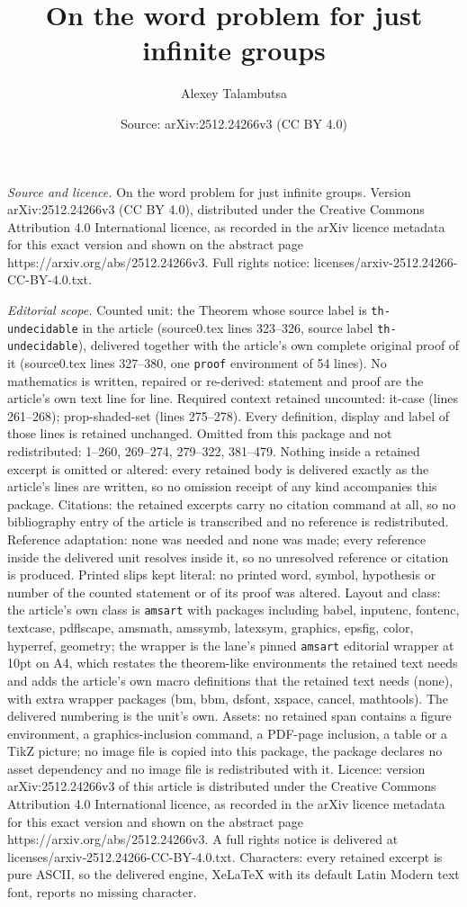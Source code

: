 \documentclass[10pt,a4paper]{amsart}
\title[On the word problem for just infinite groups]{On the word problem for just infinite groups}
\author{Alexey Talambutsa}
\date{Source: arXiv:2512.24266v3 (CC BY 4.0)}
\begin{document}
\maketitle

\noindent\emph{Source and licence.} On the word problem for just infinite groups. Version arXiv:2512.24266v3 (CC BY 4.0), distributed under the Creative Commons Attribution 4.0 International licence, as recorded in the arXiv licence metadata for this exact version and shown on the abstract page https://arxiv.org/abs/2512.24266v3. Full rights notice: licenses/arxiv-2512.24266-CC-BY-4.0.txt.\par\smallskip

\noindent\textit{Editorial scope.} Counted unit: the Theorem whose source label is \texttt{th-undecidable} in the article (source0.tex lines 323--326, source label \texttt{th-undecidable}), delivered together with the article's own complete original proof of it (source0.tex lines 327--380, one \texttt{proof} environment of 54 lines). No mathematics is written, repaired or re-derived: statement and proof are the article's own text line for line. Required context retained uncounted: it-case (lines 261--268); prop-shaded-set (lines 275--278). Every definition, display and label of those lines is retained unchanged. Omitted from this package and not redistributed: 1--260, 269--274, 279--322, 381--479. Nothing inside a retained excerpt is omitted or altered: every retained body is delivered exactly as the article's lines are written, so no omission receipt of any kind accompanies this package. Citations: the retained excerpts carry no citation command at all, so no bibliography entry of the article is transcribed and no reference is redistributed. Reference adaptation: none was needed and none was made; every reference inside the delivered unit resolves inside it, so no unresolved reference or citation is produced. Printed slips kept literal: no printed word, symbol, hypothesis or number of the counted statement or of its proof was altered. Layout and class: the article's own class is \texttt{amsart} with packages including babel, inputenc, fontenc, textcase, pdflscape, amsmath, amssymb, latexsym, graphics, epsfig, color, hyperref, geometry; the wrapper is the lane's pinned \texttt{amsart} editorial wrapper at 10pt on A4, which restates the theorem-like environments the retained text needs and adds the article's own macro definitions that the retained text needs (none), with extra wrapper packages (bm, bbm, dsfont, xspace, cancel, mathtools). The delivered numbering is the unit's own. Assets: no retained span contains a figure environment, a graphics-inclusion command, a PDF-page inclusion, a table or a TikZ picture; no image file is copied into this package, the package declares no asset dependency and no image file is redistributed with it. Licence: version arXiv:2512.24266v3 of this article is distributed under the Creative Commons Attribution 4.0 International licence, as recorded in the arXiv licence metadata for this exact version and shown on the abstract page https://arxiv.org/abs/2512.24266v3. A full rights notice is delivered at licenses/arxiv-2512.24266-CC-BY-4.0.txt. Characters: every retained excerpt is pure ASCII, so the delivered engine, XeLaTeX with its default Latin Modern text font, reports no missing character.
\end{document}
